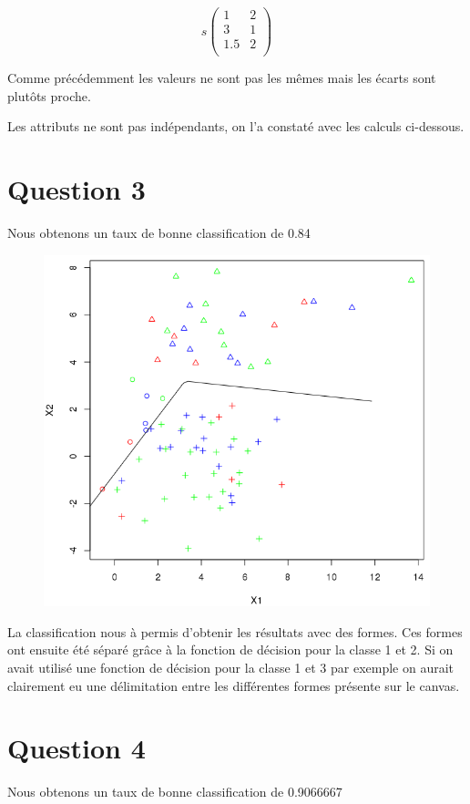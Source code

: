 \documentclass[a4paper,12pt]{report}
\begin{document}
\[s
   \left (
   \begin{array}{cc}
      1 & 2 \\
      3 & 1 \\
      1.5 & 2 \\
   \end{array}
   \right )
\]

Comme précédemment les valeurs ne sont pas les mêmes mais les écarts sont plutôts proche.

Les attributs ne sont pas indépendants, on l'a constaté avec les calculs ci-dessous.

\section*{Question 3}
Nous obtenons un taux de bonne classification de 0.84
	
\begin{figure}[!ht]
	\center
	\includegraphics[scale=0.5]{image/q3.png}
\end{figure}

La classification nous à permis d'obtenir les résultats avec des formes. Ces formes ont ensuite été séparé grâce à la fonction de décision pour la classe 1 et 2. Si on avait utilisé une fonction de décision pour la classe 1 et 3 par exemple on aurait clairement eu une délimitation entre les différentes formes présente sur le canvas.

\section*{Question 4}
Nous obtenons un taux de bonne classification de 0.9066667
	
\end{document}
